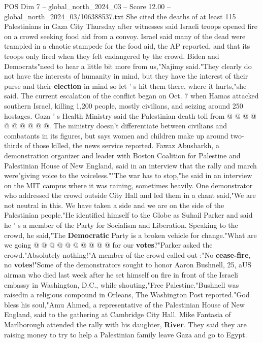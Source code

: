 \begin{textsample}{POS Dim 7 – global\_north\_2024\_03 – Score 12.00 – global\_north\_2024\_03/106388537.txt}
She cited the deaths of at least 115 Palestinians in Gaza City Thursday after witnesses said Israeli troops opened fire on a crowd seeking food aid from a convoy.
Israel said many of the dead were trampled in a chaotic stampede for the food aid, the AP reported, and that its troops only fired when they felt endangered by the crowd.
Biden and Democrats"need to hear a little bit more from us,"Najimy said."They clearly do not have the interests of humanity in mind, but they have the interest of their purse and their \textbf{election} in mind so let ' s hit them there, where it hurts,"she said.
The current escalation of the conflict began on Oct. 7 when Hamas attacked southern Israel, killing 1,200 people, mostly civilians, and seizing around 250 hostages.
Gaza ' s Health Ministry said the Palestinian death toll from @ @ @ @ @ @ @ @ @ @.
The ministry doesn't differentiate between civilians and combatants in its figures, but says women and children make up around two-thirds of those killed, the news service reported.
Fawaz Abusharkh, a demonstration organizer and leader with Boston Coalition for Palestine and Palestinian House of New England, said in an interview that the rally and march were"giving voice to the voiceless.""The war has to stop,"he said in an interview on the MIT campus where it was raining, sometimes heavily.
One demonstrator who addressed the crowd outside City Hall and led them in a chant said,"We are not neutral in this.
We have taken a side and we are on the side of the Palestinian people."He identified himself to the Globe as Suhail Parker and said he ' s a member of the Party for Socialism and Liberation.
Speaking to the crowd, he said,"The \textbf{Democratic} Party is a broken vehicle for change."What are we going @ @ @ @ @ @ @ @ @ @ for our \textbf{votes}?"Parker asked the crowd."Absolutely nothing!"A member of the crowd called out :"No \textbf{cease-fire}, no \textbf{votes}!"Some of the demonstrators sought to honor Aaron Bushnell, 25, aUS airman who died last week after he set himself on fire in front of the Israeli embassy in Washington, D.C., while shouting,"Free Palestine."Bushnell was raisedin a religious compound in Orleans, The Washington Post reported."God bless his soul,"Amu Ahmed, a representative of the Palestinian House of New England, said to the gathering at Cambridge City Hall.
Mike Fantasia of Marlborough attended the rally with his daughter, \textbf{River}.
They said they are raising money to try to help a Palestinian family leave Gaza and go to Egypt.

\end{textsample}
